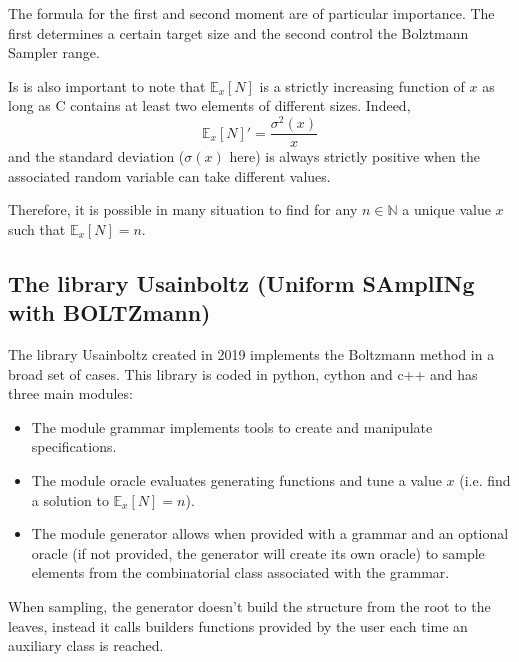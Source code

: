 \documentclass{article}
\begin{document}
The formula for the first and second moment are of particular importance. The first determines a certain target size and the second control the Bolztmann Sampler range.

Is is also important to note that $\mathbb{E}_x[N]$ is a strictly increasing function of $x$ as long as {\rsfs C} contains at least two elements of different sizes. Indeed, $$\mathbb{E}_x[N]' = \frac{\sigma^2(x)}{x}$$ and the standard deviation ($\sigma(x)$ here) is always strictly positive when the associated random variable can take different values.

Therefore, it is possible in many situation to find for any $n\in \mathbb{N}$ a unique value $x$ such that $\mathbb{E}_x[N] = n$.

\subsection{The library Usainboltz (Uniform SAmplINg with BOLTZmann)}
The library Usainboltz created in 2019 implements the Boltzmann method in a broad set of cases. This library is coded in python, cython and c++ and has three main modules:
\begin{itemize}
	\item The module grammar implements tools to create and manipulate specifications.
	\item The module oracle evaluates generating functions and tune a value $x$ (i.e. find a solution to $\mathbb{E}_x[N] = n$).
	\item The module generator allows when provided with a grammar and an optional oracle (if not provided, the generator will create its own oracle) to sample elements from the combinatorial class associated with the grammar.
\end{itemize} 

When sampling, the generator doesn't build the structure from the root to the leaves, instead it calls builders functions provided by the user each time an auxiliary class is reached.
\end{document}
